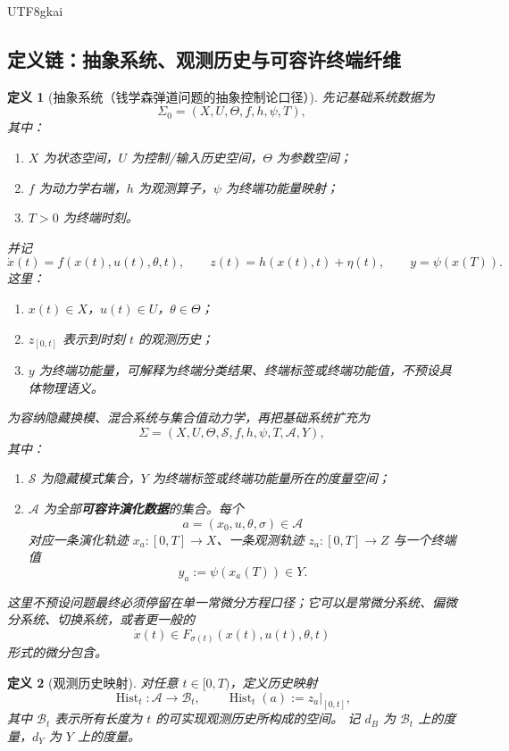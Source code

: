 \documentclass[12pt]{article}
\newtheorem{definition}{定义}[section]
\newcommand{\Hist}{\operatorname{Hist}}
\begin{document}
\begin{CJK*}{UTF8}{gkai}
\subsection{定义链：抽象系统、观测历史与可容许终端纤维}
\label{subsec:tex1-ch1-defs-system}

\begin{definition}[抽象系统（钱学森弹道问题的抽象控制论口径）]
\label{def:tex1-abstract-system}
先记基础系统数据为
\[
  \Sigma_0=(X,U,\Theta,f,h,\psi,T),
\]
其中：
\begin{enumerate}
  \item $X$ 为状态空间，$U$ 为控制/输入历史空间，$\Theta$ 为参数空间；
  \item $f$ 为动力学右端，$h$ 为观测算子，$\psi$ 为终端功能量映射；
  \item $T>0$ 为终端时刻。
\end{enumerate}
并记
\[
  \dot x(t)=f(x(t),u(t),\theta,t),
  \qquad
  z(t)=h(x(t),t)+\eta(t),
  \qquad
  y=\psi(x(T)).
\]
这里：
\begin{enumerate}
  \item $x(t)\in X$，$u(t)\in U$，$\theta\in\Theta$；
  \item $z_{[0,t]}$ 表示到时刻 $t$ 的观测历史；
  \item $y$ 为终端功能量，可解释为终端分类结果、终端标签或终端功能值，不预设具体物理语义。
\end{enumerate}

为容纳隐藏换模、混合系统与集合值动力学，再把基础系统扩充为
\[
  \Sigma=(X,U,\Theta,\mathcal S,f,h,\psi,T,\mathcal A,Y),
\]
其中：
\begin{enumerate}
  \item $\mathcal S$ 为隐藏模式集合，$Y$ 为终端标签或终端功能量所在的度量空间；
  \item $\mathcal A$ 为全部\textbf{可容许演化数据}的集合。每个
  \[
    a=(x_0,u,\theta,\sigma)\in\mathcal A
  \]
  对应一条演化轨迹 $x_a:[0,T]\to X$、一条观测轨迹 $z_a:[0,T]\to Z$ 与一个终端值
  \[
    y_a:=\psi(x_a(T))\in Y.
  \]
\end{enumerate}
这里不预设问题最终必须停留在单一常微分方程口径；它可以是常微分系统、偏微分系统、切换系统，或者更一般的
\[
  \dot x(t)\in F_{\sigma(t)}(x(t),u(t),\theta,t)
\]
形式的微分包含。
\end{definition}

\begin{definition}[观测历史映射]
\label{def:tex1-history-map}
对任意 $t\in[0,T)$，定义历史映射
\[
  \Hist_t:\mathcal A\to \mathcal B_t,
  \qquad
  \Hist_t(a):=z_a|_{[0,t]},
\]
其中 $\mathcal B_t$ 表示所有长度为 $t$ 的可实现观测历史所构成的空间。
记 $d_B$ 为 $\mathcal B_t$ 上的度量，$d_Y$ 为 $Y$ 上的度量。
\end{definition}


\end{CJK*}
\end{document}
